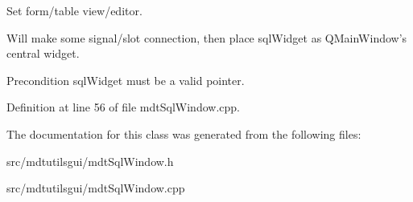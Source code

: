 Set form/table view/editor. 

Will make some signal/slot connection, then place sqlWidget as QMainWindow's central widget.

\begin{DoxyPrecond}{Precondition}
sqlWidget must be a valid pointer. 
\end{DoxyPrecond}


Definition at line 56 of file mdtSqlWindow.cpp.



The documentation for this class was generated from the following files:\begin{DoxyCompactItemize}
\item 
src/mdtutilsgui/mdtSqlWindow.h\item 
src/mdtutilsgui/mdtSqlWindow.cpp\end{DoxyCompactItemize}
